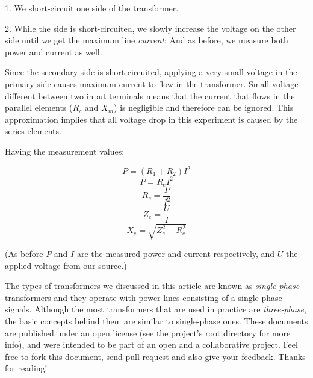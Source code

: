 \documentclass{article}
\begin{document}
	1. We short-circuit one side of the transformer.

	2. While the side is short-circuited, we slowly increase the voltage on the other side until we get the maximum line \textit{current}; And as before, we measure both power and current as well.

	Since the secondary side is short-circuited, applying a very small voltage in the primary side causes maximum current to flow in the transformer.
	Small voltage different between two input terminals means that the current that flows in the parallel elements ($R_c$ and $X_m$) is negligible and therefore can be ignored.
	This approximation implies that all voltage drop in this experiment is caused by the series elements.
	
	Having the measurement values:
	
	$$ P = (R_1 + R_2)I^2 $$
	$$ P = R_e I^2 $$
	$$ R_e = \frac{P}{I^2} $$
	$$ Z_e = \frac{U}{I} $$
	$$ X_e = \sqrt{Z_e^2 - R_e^2}$$

	(As before $P$ and $I$ are the measured power and current respectively, and $U$ the applied voltage from our source.)
	
	The types of transformers we discussed in this article are known as \textit{single-phase} transformers and they operate with power lines consisting of a single phase signals. 
	Although the most transformers that are used in practice are \textit{three-phase}, the basic concepts behind them are similar to single-phase ones.
	These documents are published under an open license (see the project's root directory for more info), and were intended to be part of an open and a collaborative project. Feel free to fork this document, send pull request and also give your feedback. Thanks for reading!
	
\end{document}
